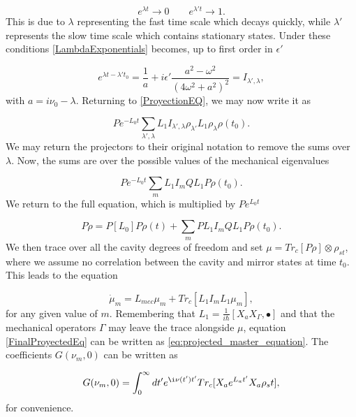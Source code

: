 \documentclass[reprint, amsmath,amssymb, aps,pra]{revtex4-1}
\begin{document}
\begin{equation}
e^{\lambda t} \to 0 \qquad e^{\lambda' t} \to 1.
\end{equation} This is due to $\lambda$ representing the fast time scale which decays quickly, while $\lambda'$ represents the slow time scale which contains stationary states. Under these conditions \eqref{LambdaExponentials} becomes, up to first order in $\epsilon'$

\begin{equation}
[\int_{t_0}^t dt' e^{(\lambda'-\lambda)t'}]e^{\lambda t- \lambda't_0} = \frac{1}{a} + i\epsilon' \frac{a^2 - \omega^2}{(4\omega^2 + a^2)^2} = I_{\lambda',\lambda},
\end{equation} with $a = i\nu_0 - \lambda$. Returning to \eqref{ProyectionEQ}, we may now write it as

\begin{equation}
Pe^{-L_0 t} \sum_{\lambda',\lambda} L_1 I_{\lambda',\lambda} \rho_{\lambda'} L_1 \rho_\lambda \rho(t_0).
\end{equation} We may return the projectors to their original notation to remove the sums over $\lambda$.  Now, the sums are over the possible values of the mechanical eigenvalues 

\begin{equation}
Pe^{-L_0 t} \sum_{m} L_1 I_{m} Q L_1 P \rho(t_0).
\end{equation} We return to the full equation, which is multiplied by $Pe^{L_0 t}$ 

\begin{equation}
P\dot{\rho} = P[L_0]P \rho(t) + \sum_{m} P L_1 I_{m} Q L_1 P \rho(t_0).
\end{equation} We then trace over all the cavity degrees of freedom and set  $\mu = Tr_c[P\rho]\otimes \rho_{st}$, where we assume no correlation between the cavity and mirror states at time $t_0$. This leads to the equation

\begin{equation}\label{FinalProyectedEq}
\dot{\mu}_m = L_{mec}\mu_m + Tr_c[ L_1 I_m L_1  \mu_m],
\end{equation} for any given value of $m$. Remembering that $L_1 = \frac{1}{i\hbar}[X_a X_\Gamma,\bullet]$ and that the mechanical operators $\Gamma$ may leave the trace alongside $\mu$, equation \eqref{FinalProyectedEq} can be written as \eqref{eq:projected_master_equation}. The coefficients $G(\nu_m,0)$ can be written as

\begin{equation}\label{GAppendix}
G(\nu_m,0)=\int_0^\infty dt' e^{\i\nu(t')t'}Tr_c[X_a e^{L_a t'} X_a \rho_st], 
\end{equation} for convenience.
\end{document}
